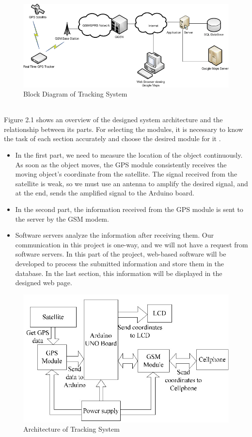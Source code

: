 \begin{figure}[!h]
	\centerline{\includegraphics[width=.8\textwidth]{GPS_Tracker}}
	\caption{Block Diagram of Tracking System \cite{6}}
\end{figure}\\
Figure 2.1 shows an overview of the designed system architecture and the relationship between its parts. ّFor selecting the modules, it is necessary to know the task of each section accurately and choose the desired module for it \cite{7}.
\begin{itemize}
	\item In the first part, we need to measure the location of the object continuously. As soon as the object moves, the GPS module consistently receives the moving object's coordinate from the satellite. The signal received from the satellite is weak, so we must use an antenna to amplify the desired signal, and at the end, sends the amplified signal to the Arduino board.
	\item In the second part, the information received from the GPS module is sent to the server by the GSM modem.
	\item Software servers analyze the information after receiving them. Our communication in this project is one-way, and we will not have a request from software servers. In this part of the project, web-based software will be developed to process the submitted information and store them in the database. In the last section, this information will be displayed in the designed web page.
\end{itemize}
\begin{figure}[!h]
	\centerline{\includegraphics[width=.6\textwidth]{blockdiagram}}
	\caption{Architecture of Tracking System\cite{3}}
\end{figure}
